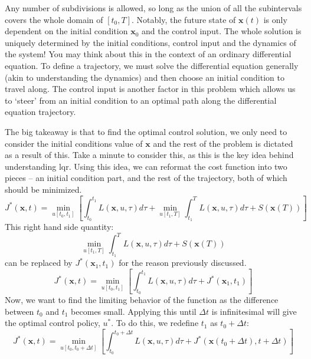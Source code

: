 Any number of subdivisions is allowed, so long as the union of all the subintervals covers the whole domain of $[t_0,T]$. Notably, the future state of $\bm{x}(t)$ is only dependent on the initial condition $\bm{x}_0$  and the control input. The whole solution is uniquely determined by the initial conditions, control input and the dynamics of the system! You may think about this in the context of an ordinary differential equation. To define a trajectory, we must solve the differential equation generally (akin to understanding the dynamics) and then choose an initial condition to travel along. The control input is another factor in this problem which allows us to `steer' from an initial condition to an optimal path along the differential equation trajectory. 

The big takeaway is that to find the optimal control solution, we only need to consider the initial conditions value of $\bm{x}$ and the rest of the problem is dictated as a result of this. Take a minute to consider this, as this is the key idea behind understanding \gls{lqr}. Using this idea, we can reformat the cost function into two pieces -- an initial condition part, and the rest of the trajectory, both of which should be minimized.
$$J^*(\bm{x},t)=\min_{u[t_0,t_1]}\left[
\int_{t_0}^{t_1}{L(\bm{x},u,\tau)d\tau}+\min_{u[t_1,T]}\int_{t_1}^{T}{L(\bm{x},u,\tau)d\tau}+S(\bm{x}(T))\right]$$
This right hand side quantity:
$$\min_{u[t_1,T]}\int_{t_1}^{T}{L(\bm{x},u,\tau)d\tau}+S(\bm{x}(T))$$
can be replaced by $J^*(\bm{x}_1,t_1)$ for the reason previously discussed.
$$J^*(\bm{x},t)=\min_{u[t_0,t_1]}\left[
\int_{t_0}^{t_1}{L(\bm{x},u,\tau)d\tau}+J^*(\bm{x}_1,t_1)\right]$$
Now, we want to find the limiting behavior of the function as the difference between $t_0$ and $t_1$ becomes small. Applying this until $\Delta t$ is infinitesimal will give the optimal control policy, $u^*$. To do this, we redefine $t_1$ as $t_0+\Delta t$:
$$J^*(\bm{x},t)=\min_{u[t_0,t_0+\Delta t]}\left[
\int_{t_0}^{t_0+\Delta t}{L(\bm{x},u,\tau)d\tau}+J^*(\bm{x}(t_0+\Delta t),t+\Delta t)\right]$$

